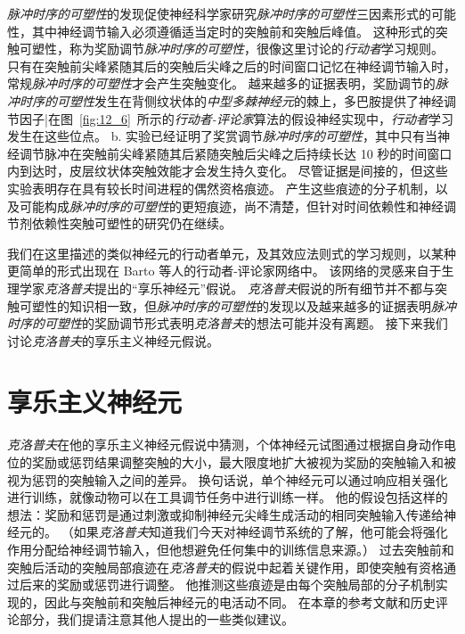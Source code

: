 \textit{脉冲时序的可塑性}的发现促使神经科学家研究\textit{脉冲时序的可塑性}三因素形式的可能性，其中神经调节输入必须遵循适当定时的突触前和突触后峰值。
这种形式的突触可塑性，称为奖励调节\textit{脉冲时序的可塑性}，很像这里讨论的\textit{行动者}学习规则。
只有在突触前尖峰紧随其后的突触后尖峰之后的时间窗口记忆在神经调节输入时，常规\textit{脉冲时序的可塑性}才会产生突触变化。
越来越多的证据表明，奖励调节的\textit{脉冲时序的可塑性}发生在背侧纹状体的\textit{中型多棘神经元}的棘上，多巴胺提供了神经调节因子|在图~\ref{fig:12_6}~所示的\textit{行动者-评论家}算法的假设神经实现中，\textit{行动者}学习发生在这些位点。
b. 实验已经证明了奖赏调节\textit{脉冲时序的可塑性}，其中只有当神经调节脉冲在突触前尖峰紧随其后紧随突触后尖峰之后持续长达 10 秒的时间窗口内到达时，皮层纹状体突触效能才会发生持久变化\cite{yagishita2014critical}。
尽管证据是间接的，但这些实验表明存在具有较长时间进程的偶然资格痕迹。
产生这些痕迹的分子机制，以及可能构成\textit{脉冲时序的可塑性}的更短痕迹，尚不清楚，但针对时间依赖性和神经调节剂依赖性突触可塑性的研究仍在继续。


我们在这里描述的类似神经元的行动者单元，及其效应法则式的学习规则，以某种更简单的形式出现在 Barto 等人的行动者-评论家网络中\cite{barto13neuron}。
该网络的灵感来自于生理学家\textit{克洛普夫}提出的“享乐神经元”假说\cite{klopf1972brain,klopf1982hedonistic}。
\textit{克洛普夫}假说的所有细节并不都与突触可塑性的知识相一致，但\textit{脉冲时序的可塑性}的发现以及越来越多的证据表明\textit{脉冲时序的可塑性}的奖励调节形式表明\textit{克洛普夫}的想法可能并没有离题。
接下来我们讨论\textit{克洛普夫}的享乐主义神经元假说。



\section{享乐主义神经元} \label{sec:hedonistic_neurons}


\textit{克洛普夫}\cite{klopf1972brain,klopf1982hedonistic}在他的享乐主义神经元假说中猜测，个体神经元试图通过根据自身动作电位的奖励或惩罚结果调整突触的大小，最大限度地扩大被视为奖励的突触输入和被视为惩罚的突触输入之间的差异。
换句话说，单个神经元可以通过响应相关强化进行训练，就像动物可以在工具调节任务中进行训练一样。
他的假设包括这样的想法：奖励和惩罚是通过刺激或抑制神经元尖峰生成活动的相同突触输入传递给神经元的。
（如果\textit{克洛普夫}知道我们今天对神经调节系统的了解，他可能会将强化作用分配给神经调节输入，但他想避免任何集中的训练信息来源。）
过去突触前和突触后活动的突触局部痕迹在\textit{克洛普夫}的假说中起着关键作用，即使突触有资格通过后来的奖励或惩罚进行调整。
他推测这些痕迹是由每个突触局部的分子机制实现的，因此与突触前和突触后神经元的电活动不同。
在本章的参考文献和历史评论部分，我们提请注意其他人提出的一些类似建议。


